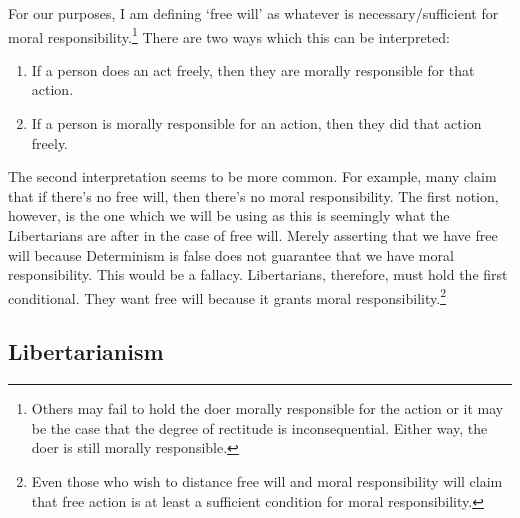 For our purposes, I am defining ‘free will’ as whatever is necessary/sufficient for moral responsibility.\footnote{Others may fail to hold the doer morally responsible for the action or it may be the case that the degree of rectitude is inconsequential. Either way, the doer is still morally responsible.} There are two ways which this can be interpreted:
\begin{enumerate}
    \item If a person does an act freely, then they are morally responsible for that action.
    \item If a person is morally responsible for an action, then they did that action freely.
\end{enumerate}
The second interpretation seems to be more common. For example, many claim that if there’s no free will, then there’s no moral responsibility. The first notion, however, is the one which we will be using as this is seemingly what the Libertarians are after in the case of free will. Merely asserting that we have free will because Determinism is false does not guarantee that we have moral responsibility. This would be a fallacy. Libertarians, therefore, must hold the first conditional. They want free will because it grants moral responsibility.\footnote{Even those who wish to distance free will and moral responsibility will claim that free action is at least a sufficient condition for moral responsibility.}
\subsection{Libertarianism}

